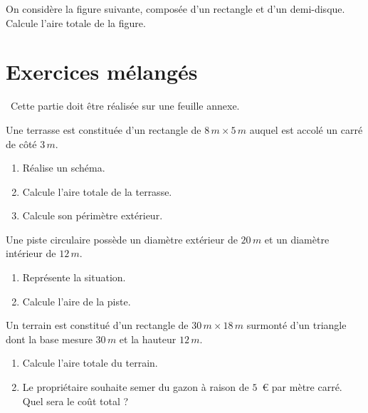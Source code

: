 \documentclass[../../syllabus_1.tex]{subfiles}
\begin{document}
\begin{exercise}
    On considère la figure suivante, composée d'un rectangle et
    d'un demi-disque. Calcule l'aire totale de la figure.
    \begin{center}
    \end{center}
\end{exercise}

\newpage
\section{Exercices mélangés}
\setcounter{exercise}{0}
~Cette partie doit être réalisée sur une feuille annexe.
\begin{exercise}
    Une terrasse est constituée d'un rectangle de $8\,m\times5\,m$
    auquel est accolé un carré de côté $3\,m$.

    \begin{enumerate}
        \item Réalise un schéma.
        \item Calcule l'aire totale de la terrasse.
        \item Calcule son périmètre extérieur.
    \end{enumerate}
\end{exercise}

\begin{exercise}
    Une piste circulaire possède un diamètre extérieur de $20\,m$
    et un diamètre intérieur de $12\,m$.

    \begin{enumerate}
        \item Représente la situation.
        \item Calcule l'aire de la piste.
    \end{enumerate}
\end{exercise}

\begin{exercise}
    Un terrain est constitué d'un rectangle de $30\,m\times18\,m$
    surmonté d'un triangle dont la base mesure $30\,m$ et la hauteur
    $12\,m$.

    \begin{enumerate}
        \item Calcule l'aire totale du terrain.
        \item Le propriétaire souhaite semer du gazon à raison de
        $5\,$ € par mètre carré. Quel sera le coût total ?
    \end{enumerate}
\end{exercise}
\end{document}
